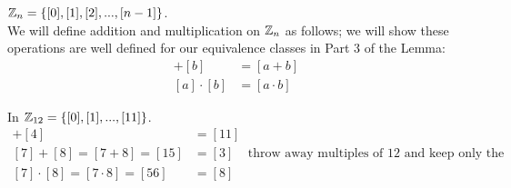 ${\mathbb{ Z}}_n=\{[0],[1],[2],...,[n-1]\}$.\\
\noindent We will define addition and multiplication on ${\mathbb{ Z}}_n$ as follows; we will show these operations are well defined for our equivalence classes in Part 3 of the Lemma:
\begin{align}
    [a]+[b]&=[a+b] \nonumber \\
    [a]\cdot[b]&=[a\cdot b] \nonumber
\end{align}
\begin{example}
In ${\mathbb{ Z}}_{12}=\{[0],[1],...,[11]\}$.
\begin{align}
    [7]+[4]&=[11]\nonumber \\
    [7]+[8]=[7+8]=[15]&=[3] \ \ \ \ \ \text{throw away multiples of 12 and keep only the remainder.}\nonumber \\
    [7]\cdot[8]=[7\cdot 8]=[56]&=[8] \nonumber
\end{align}
\end{example}
